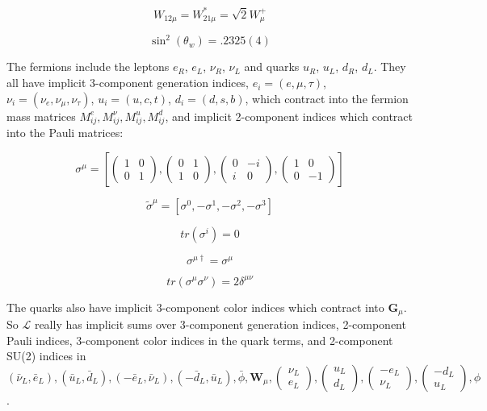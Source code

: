 \documentclass[12pt,a4paper,pagesize=pdftex]{scrartcl}
\newcommand{\icol}[1]{%
  \left(\begin{smallmatrix}#1\end{smallmatrix}\right)%
}
\begin{document}
\begin{equation*}
	W_{12\mu}=W_{21\mu}^*=\sqrt{2}W_\mu^+
\end{equation*}

\begin{equation*}
	\sin^2\left(\theta_w\right)=.2325(4)
\end{equation*}

The fermions include the leptons $e_R$, $e_L$, $\nu_R$, $\nu_L$ and quarks $u_R$, $u_L$, $d_R$, $d_L$. They all have implicit 3-component generation indices, $e_i=\left(e,\mu,\tau\right)$, $\nu_i=\left(\nu_e,\nu_\mu,\nu_\tau\right)$, $u_i=\left(u,c,t\right)$, $d_i=\left(d,s,b\right)$, which contract into the fermion mass matrices $M_{ij}^e,M_{ij}^\nu,M_{ij}^u,M_{ij}^d$, and implicit 2-component indices which contract into the Pauli matrices:

\begin{equation*}
	\sigma^\mu=\left[\left(\begin{matrix}1&0\\0&1\end{matrix}\right),\left(\begin{matrix}0&1\\1&0\end{matrix}\right),\left(\begin{matrix}0&-i\\i&0\end{matrix}\right),\left(\begin{matrix}1&0\\0&-1\end{matrix}\right)\right]
\end{equation*}

\begin{equation*}
	\tilde{\sigma}^\mu=\left[\sigma^0,-\sigma^1,-\sigma^2,-\sigma^3\right]
\end{equation*}

\begin{equation*}
	tr\left(\sigma^i\right)=0
\end{equation*}

\begin{equation*}
	\sigma^{\mu\dagger}=\sigma^\mu
\end{equation*}

\begin{equation*}
	tr\left(\sigma^\mu\sigma^\nu\right)=2\delta^{\mu\nu}
\end{equation*}

The quarks also have implicit 3-component color indices which contract into $\mathbf{G}_\mu$. So $\mathcal{L}$ really has implicit sums over 3-component generation indices, 2-component Pauli indices, 3-component color indices in the quark terms, and 2-component SU(2) indices in $\left(\bar{\nu}_L,\bar{e}_L\right),\left(\bar{u}_L,\bar{d}_L\right),\left(-\bar{e}_L,\bar{\nu}_L\right),\left(-\bar{d}_L,\bar{u}_L\right),\bar{\phi},\mathbf{W}_\mu,\icol{\nu_L\\e_L},\icol{u_L\\d_L},\icol{-e_L\\\nu_L},\icol{-d_L\\u_L},\phi$.
\end{document}

